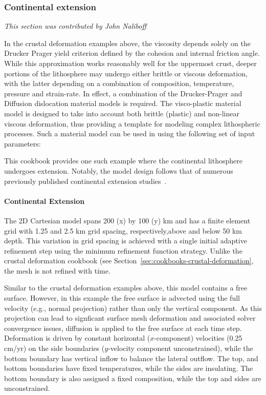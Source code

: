 \subsubsection{Continental extension}
\label{sec:cookbooks-continental-extension}
\textit{This section was contributed by John Naliboff}

In the crustal deformation examples above, the viscosity depends solely on the Drucker Prager yield criterion defined by the cohesion and internal friction angle. While this approximation works reasonably well for the uppermost crust, deeper portions of the lithosphere may undergo either brittle or viscous deformation, with the latter depending on a combination of composition, temperature, pressure and strain-rate. In effect, a combination of the Drucker-Prager and Diffusion dislocation material models is required. The visco-plastic material model is designed to take into account both brittle (plastic) and non-linear viscous deformation, thus providing a template for modeling complex lithospheric processes. Such a material model can be used in \aspect{} using the following set of input parameters:



This cookbook provides one such example where the continental lithosphere undergoes extension. Notably, the model design follows that of numerous previously published continental extension studies~\cite[and references therein]{Hui11,Bru14,Nal15}.

\paragraph{Continental Extension}
The 2D Cartesian model spans 200 (x) by 100 (y) km and has a finite element grid with 1.25 and 2.5 km grid spacing, respectively,above and  below 50 km depth. This variation in grid spacing is achieved with a single initial adaptive refinement step using the minimum refinement function strategy. Unlike the crustal deformation cookbook (see Section~\ref{sec:cookbooks-crustal-deformation}, the mesh is not refined with time.




Similar to the crustal deformation examples above, this model contains a free surface. However, in this example the free surface is advected using the full velocity (e.g., normal projection) rather than only the vertical component. As this projection can lead to signficant surface mesh deformation and associated solver convergence issues, diffusion is applied to the free surface at each time step. Deformation is driven by constant horizontal ($x$-component) velocities (0.25 cm/yr) on the side boundaries ($y$-velocity component unconstrained), while the bottom boundary has vertical inflow to balance the lateral outflow. The top, and bottom boundaries have fixed temperatures, while the sides are insulating. The bottom boundary is also assigned a fixed composition, while the top and sides are unconstrained.


